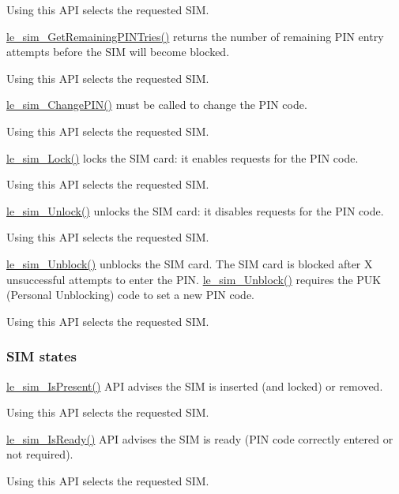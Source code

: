 Using this A\+P\+I selects the requested S\+I\+M.

\hyperlink{le__sim__interface_8h_a8886dbb94aa732883ec5a67ddd345f98}{le\+\_\+sim\+\_\+\+Get\+Remaining\+P\+I\+N\+Tries()} returns the number of remaining P\+I\+N entry attempts before the S\+I\+M will become blocked.

Using this A\+P\+I selects the requested S\+I\+M.

\hyperlink{le__sim__interface_8h_a761bbdf28094b906236320445d9b9166}{le\+\_\+sim\+\_\+\+Change\+P\+I\+N()} must be called to change the P\+I\+N code.

Using this A\+P\+I selects the requested S\+I\+M.

\hyperlink{le__sim__interface_8h_a9e21c9a633b4675997238cefaa96b9a8}{le\+\_\+sim\+\_\+\+Lock()} locks the S\+I\+M card\+: it enables requests for the P\+I\+N code.

Using this A\+P\+I selects the requested S\+I\+M.

\hyperlink{le__sim__interface_8h_a36f50d2da76a981a8f671424dccb1c1d}{le\+\_\+sim\+\_\+\+Unlock()} unlocks the S\+I\+M card\+: it disables requests for the P\+I\+N code.

Using this A\+P\+I selects the requested S\+I\+M.

\hyperlink{le__sim__interface_8h_a77293780d1e14f291418181c7c3c11f0}{le\+\_\+sim\+\_\+\+Unblock()} unblocks the S\+I\+M card. The S\+I\+M card is blocked after X unsuccessful attempts to enter the P\+I\+N. \hyperlink{le__sim__interface_8h_a77293780d1e14f291418181c7c3c11f0}{le\+\_\+sim\+\_\+\+Unblock()} requires the P\+U\+K (Personal Unblocking) code to set a new P\+I\+N code.

Using this A\+P\+I selects the requested S\+I\+M.\hypertarget{c_sim_le_sim_state}{}\subsubsection{S\+I\+M states}\label{c_sim_le_sim_state}
\hyperlink{le__sim__interface_8h_aa3255a29cec4358c5e0d68b9ac62ff88}{le\+\_\+sim\+\_\+\+Is\+Present()} A\+P\+I advises the S\+I\+M is inserted (and locked) or removed.

Using this A\+P\+I selects the requested S\+I\+M.

\hyperlink{le__sim__interface_8h_ace457890856d3692ecb4176f0e892558}{le\+\_\+sim\+\_\+\+Is\+Ready()} A\+P\+I advises the S\+I\+M is ready (P\+I\+N code correctly entered or not required).

Using this A\+P\+I selects the requested S\+I\+M.

